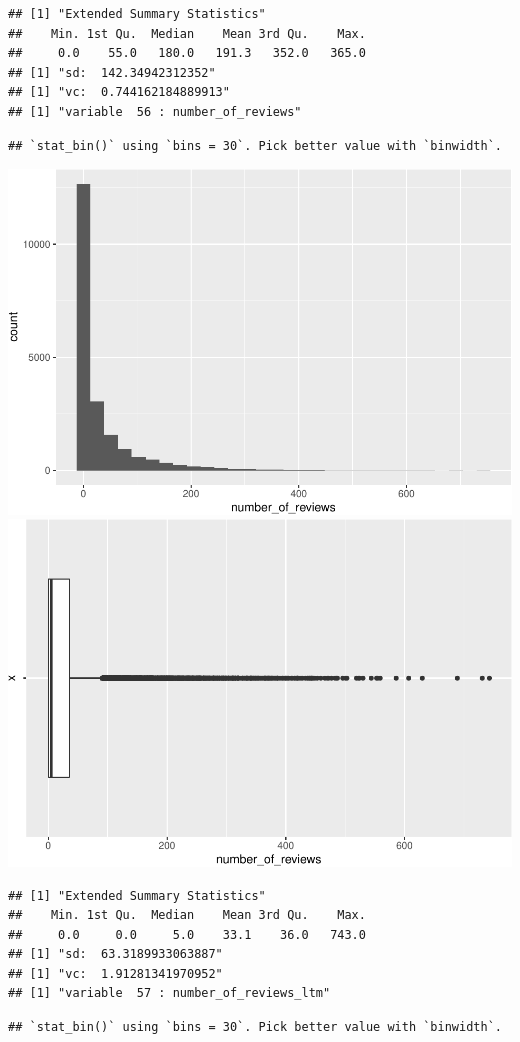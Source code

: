 \begin{verbatim}
## [1] "Extended Summary Statistics"
##    Min. 1st Qu.  Median    Mean 3rd Qu.    Max. 
##     0.0    55.0   180.0   191.3   352.0   365.0 
## [1] "sd:  142.34942312352"
## [1] "vc:  0.744162184889913"
## [1] "variable  56 : number_of_reviews"
\end{verbatim}

\begin{verbatim}
## `stat_bin()` using `bins = 30`. Pick better value with `binwidth`.
\end{verbatim}

\includegraphics[width=0.5\linewidth]{anal_files/figure-latex/figures-side-36}
\includegraphics[width=0.5\linewidth]{anal_files/figure-latex/figures-side-37}

\begin{verbatim}
## [1] "Extended Summary Statistics"
##    Min. 1st Qu.  Median    Mean 3rd Qu.    Max. 
##     0.0     0.0     5.0    33.1    36.0   743.0 
## [1] "sd:  63.3189933063887"
## [1] "vc:  1.91281341970952"
## [1] "variable  57 : number_of_reviews_ltm"
\end{verbatim}

\begin{verbatim}
## `stat_bin()` using `bins = 30`. Pick better value with `binwidth`.
\end{verbatim}

